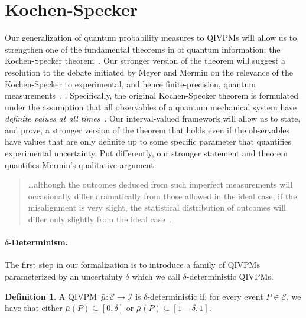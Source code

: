 \documentclass[english,reprint, aps, prl,superscriptaddress, showpacs,
showkeys, longbibliography, amsmath, amssymb]{revtex4-1}
\theoremstyle{plain}
\theoremstyle{definition}
\newtheorem{definition}{Definition}
\newcommand{\events}{\ensuremath{\mathcal{E}}}
\begin{document}
\section{Kochen-Specker} 
\label{sec:Kochen-Specker}
  
Our generalization of quantum probability measures to QIVPMs will
allow us to strengthen one of the fundamental theorems in of quantum
information: the Kochen-Specker
theorem~\cite{PeresRon1988,peres1995quantum}. Our stronger version of
the theorem will suggest a resolution to the debate initiated by Meyer
and Mermin on the relevance of the Kochen-Specker to experimental, and
hence finite-precision, quantum
measurements~\citep{PhysRevLett.83.3751,Mermin1999,Kent1999,HavlicekKrennSummhammerSvozil2001,SimonBruknerZeilinger2001,Cabello2002,Larsson2002,Appleby2002,Peres2003,BarrettKent2004,Appleby_2005,Spekkens2005,GuehneKleinmannCabelloEtAl2010,MazurekPuseyKunjwalEtAl2016}.
. Specifically, the original Kochen-Specker theorem is formulated
under the assumption that all observables of a quantum mechanical
system have \emph{definite values at all
  times}~\cite{Held2016}. Our interval-valued framework will allow
us to state, and prove, a stronger version of the theorem that holds
even if the observables have values that are only definite up to some
specific parameter that quantifies experimental uncertainty. Put
differently, our stronger statement and theorem quantifies Mermin's
qualitative argument:
\begin{quote}
  \ldots although the outcomes deduced from such imperfect
  measurements will occasionally differ dramatically from those
  allowed in the ideal case, if the misalignment is very slight, the
  statistical distribution of outcomes will differ only slightly from
  the ideal case~\citep{Mermin1999}.
\end{quote}

\paragraph*{$\delta$-Determinism.} The first step in our formalization
is to introduce a family of QIVPMs parameterized by an uncertainty
$\delta$ which we call $\delta$-deterministic QIVPMs. 

\begin{definition}\label{def:delta-deterministic} A
  QIVPM~$\bar{\mu}:\events\rightarrow\mathscr{I}$ is
  $\delta$-deterministic if, for every event $P\in\events$, we have
  that either 
  $\bar{\mu}\left(P\right)\subseteq\left[0,\delta\right]$ or
  $\bar{\mu}\left(P\right)\subseteq\left[1-\delta,1\right]$. 
\end{definition}
\end{document}
